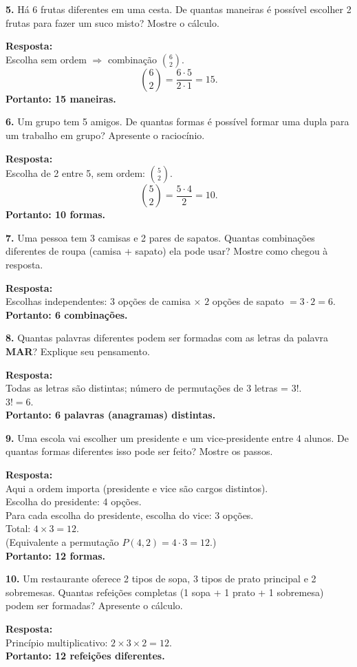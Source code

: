 \documentclass[11pt]{article}
\begin{document}
\bigskip

\textbf{5.} Há 6 frutas diferentes em uma cesta. De quantas maneiras é possível escolher 2 frutas para fazer um suco misto? Mostre o cálculo.

\textbf{Resposta:}\\
Escolha sem ordem $\Rightarrow$ combinação $\binom{6}{2}$.\\
\[
\binom{6}{2}=\frac{6\cdot 5}{2\cdot 1}=15.
\]
\textbf{Portanto: 15 maneiras.}

\bigskip

\textbf{6.} Um grupo tem 5 amigos. De quantas formas é possível formar uma dupla para um trabalho em grupo? Apresente o raciocínio.

\textbf{Resposta:}\\
Escolha de 2 entre 5, sem ordem: $\binom{5}{2}$.\\
\[
\binom{5}{2}=\frac{5\cdot 4}{2}=10.
\]
\textbf{Portanto: 10 formas.}

\bigskip

\textbf{7.} Uma pessoa tem 3 camisas e 2 pares de sapatos. Quantas combinações diferentes de roupa (camisa + sapato) ela pode usar? Mostre como chegou à resposta.

\textbf{Resposta:}\\
Escolhas independentes: $3$ opções de camisa $\times$ $2$ opções de sapato $=3\cdot2=6$.\\
\textbf{Portanto: 6 combinações.}

\bigskip

\textbf{8.} Quantas palavras diferentes podem ser formadas com as letras da palavra \textbf{MAR}? Explique seu pensamento.

\textbf{Resposta:}\\
Todas as letras são distintas; número de permutações de 3 letras = $3!$.\\
$3! = 6$.\\
\textbf{Portanto: 6 palavras (anagramas) distintas.}

\bigskip

\textbf{9.} Uma escola vai escolher um presidente e um vice-presidente entre 4 alunos. De quantas formas diferentes isso pode ser feito? Mostre os passos.

\textbf{Resposta:}\\
Aqui a ordem importa (presidente e vice são cargos distintos).\\
Escolha do presidente: 4 opções.\\
Para cada escolha do presidente, escolha do vice: 3 opções.\\
Total: $4 \times 3 = 12$.\\
(Equivalente a permutação $P(4,2)=4\cdot3=12$.)\\
\textbf{Portanto: 12 formas.}

\bigskip

\textbf{10.} Um restaurante oferece 2 tipos de sopa, 3 tipos de prato principal e 2 sobremesas. Quantas refeições completas (1 sopa + 1 prato + 1 sobremesa) podem ser formadas? Apresente o cálculo.

\textbf{Resposta:}\\
Princípio multiplicativo: $2 \times 3 \times 2 = 12$.\\
\textbf{Portanto: 12 refeições diferentes.}
\end{document}
